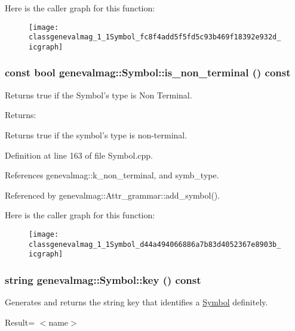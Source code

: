 Here is the caller graph for this function:\nopagebreak
\begin{figure}[H]
\begin{center}
\leavevmode
\texttt{[image: classgenevalmag\_1\_1Symbol\_fc8f4add5f5fd5c93b469f18392e932d\_icgraph]}
\end{center}
\end{figure}
\hypertarget{classgenevalmag_1_1Symbol_d44a494066886a7b83d4052367e8903b}{
\subsubsection[{is\_\-non\_\-terminal}]{\setlength{\rightskip}{0pt plus 5cm}const bool genevalmag::Symbol::is\_\-non\_\-terminal () const}}
\label{classgenevalmag_1_1Symbol_d44a494066886a7b83d4052367e8903b}


Returns true if the Symbol's type is Non Terminal. \begin{Desc}
\item[Returns:]\end{Desc}
Returns true if the symbol's type is non-terminal. 

Definition at line 163 of file Symbol.cpp.

References genevalmag::k\_\-non\_\-terminal, and symb\_\-type.

Referenced by genevalmag::Attr\_\-grammar::add\_\-symbol().

Here is the caller graph for this function:\nopagebreak
\begin{figure}[H]
\begin{center}
\leavevmode
\texttt{[image: classgenevalmag\_1\_1Symbol\_d44a494066886a7b83d4052367e8903b\_icgraph]}
\end{center}
\end{figure}
\hypertarget{classgenevalmag_1_1Symbol_ab0679bd9e80cc86a1c6fccca3a4753c}{
\subsubsection[{key}]{\setlength{\rightskip}{0pt plus 5cm}string genevalmag::Symbol::key () const}}
\label{classgenevalmag_1_1Symbol_ab0679bd9e80cc86a1c6fccca3a4753c}


Generates and returns the string key that identifies a \hyperlink{classgenevalmag_1_1Symbol}{Symbol} definitely.\par
 \par
 Result= $<$name$>$\par


